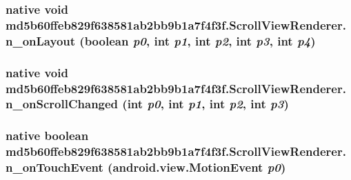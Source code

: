 \hypertarget{classmd5b60ffeb829f638581ab2bb9b1a7f4f3f_1_1_scroll_view_renderer_f028092f84bfc2747d8a55eacd9e833a}{
\subsubsection[{n\_\-onLayout}]{\setlength{\rightskip}{0pt plus 5cm}native void md5b60ffeb829f638581ab2bb9b1a7f4f3f.ScrollViewRenderer.n\_\-onLayout (boolean {\em p0}, \/  int {\em p1}, \/  int {\em p2}, \/  int {\em p3}, \/  int {\em p4})}}
\label{classmd5b60ffeb829f638581ab2bb9b1a7f4f3f_1_1_scroll_view_renderer_f028092f84bfc2747d8a55eacd9e833a}


\hypertarget{classmd5b60ffeb829f638581ab2bb9b1a7f4f3f_1_1_scroll_view_renderer_b9747abe611665b03334315d01f64462}{
\subsubsection[{n\_\-onScrollChanged}]{\setlength{\rightskip}{0pt plus 5cm}native void md5b60ffeb829f638581ab2bb9b1a7f4f3f.ScrollViewRenderer.n\_\-onScrollChanged (int {\em p0}, \/  int {\em p1}, \/  int {\em p2}, \/  int {\em p3})}}
\label{classmd5b60ffeb829f638581ab2bb9b1a7f4f3f_1_1_scroll_view_renderer_b9747abe611665b03334315d01f64462}


\hypertarget{classmd5b60ffeb829f638581ab2bb9b1a7f4f3f_1_1_scroll_view_renderer_62eb6d326ae4fcd7d9730dd8600c9ace}{
\subsubsection[{n\_\-onTouchEvent}]{\setlength{\rightskip}{0pt plus 5cm}native boolean md5b60ffeb829f638581ab2bb9b1a7f4f3f.ScrollViewRenderer.n\_\-onTouchEvent (android.view.MotionEvent {\em p0})}}
\label{classmd5b60ffeb829f638581ab2bb9b1a7f4f3f_1_1_scroll_view_renderer_62eb6d326ae4fcd7d9730dd8600c9ace}


